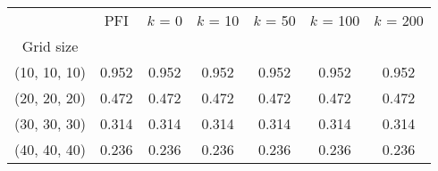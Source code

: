 \begin{tabular}{ccccccc}
\toprule
{} &    PFI &  $k$ = 0 &  $k$ = 10 &  $k$ = 50 &  $k$ = 100 &  $k$ = 200 \\
Grid size    &        &          &           &           &            &            \\
\midrule
(10, 10, 10) &  0.952 &    0.952 &     0.952 &     0.952 &      0.952 &      0.952 \\
(20, 20, 20) &  0.472 &    0.472 &     0.472 &     0.472 &      0.472 &      0.472 \\
(30, 30, 30) &  0.314 &    0.314 &     0.314 &     0.314 &      0.314 &      0.314 \\
(40, 40, 40) &  0.236 &    0.236 &     0.236 &     0.236 &      0.236 &      0.236 \\
\bottomrule
\end{tabular}
